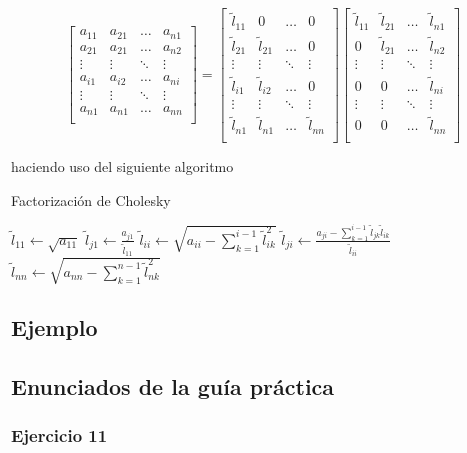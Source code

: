 \[
\begin{bmatrix}
    a_{11} & a_{21} & \ldots & a_{n1} \\
    a_{21} & a_{21} & \ldots & a_{n2} \\
    \vdots & \vdots & \ddots & \vdots \\
    a_{i1} & a_{i2} & \ldots & a_{ni} \\
    \vdots & \vdots & \ddots & \vdots \\
    a_{n1} & a_{n1} & \ldots & a_{nn} \\
\end{bmatrix}
=
\begin{bmatrix}
    \tilde{l}_{11} & 0 & \ldots & 0 \\
    \tilde{l}_{21} & \tilde{l}_{21} & \ldots & 0 \\
    \vdots & \vdots & \ddots & \vdots \\
    \tilde{l}_{i1} & \tilde{l}_{i2} & \ldots & 0 \\
    \vdots & \vdots & \ddots & \vdots \\
    \tilde{l}_{n1} & \tilde{l}_{n1} & \ldots & \tilde{l}_{nn} \\
\end{bmatrix}
\begin{bmatrix}
    \tilde{l}_{11} & \tilde{l}_{21} & \ldots & \tilde{l}_{n1} \\
    0 & \tilde{l}_{21} & \ldots & \tilde{l}_{n2} \\
    \vdots & \vdots & \ddots & \vdots \\
    0 & 0 & \ldots & \tilde{l}_{ni} \\
    \vdots & \vdots & \ddots & \vdots \\
    0 & 0 & \ldots & \tilde{l}_{nn} \\
\end{bmatrix}
\]

haciendo uso del siguiente algoritmo

\begin{algorithm}
\begin{algorithmic}
    \caption{Factorización de Cholesky}\label{alg:fact_cholesky}
    \State $\tilde{l}_{11} \gets \sqrt{a_{11}}$
        \State $\tilde{l}_{j1} \gets \frac{a_{j1}}{\tilde{l}_{11}}$
    \EndFor
        \State $\tilde{l}_{ii} \gets \sqrt{a_{ii} - \sum_{k=1}^{i-1}\tilde{l}_{ik}^{2}}$
            \State $\tilde{l}_{ji} \gets \frac{a_{ji} - \sum_{k=1}^{i-1}\tilde{l}_{jk}\tilde{l}_{ik}}{\tilde{l}_{ii}}$
        \EndFor
    \EndFor
    \State $\tilde{l}_{nn} \gets \sqrt{a_{nn} - \sum_{k=1}^{n-1}\tilde{l}_{nk}^{2}}$
\end{algorithmic}
\end{algorithm}
    
\subsection{Ejemplo}\label{subsec:ejemplo_cholesky}

\subsection{Enunciados de la guía práctica}\label{subsec:enunciados_guia_3_cholesky}

\subsubsection{Ejercicio 11}\label{subsubsec:guia_3_ej_11}